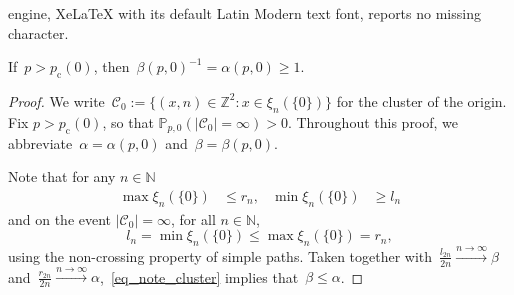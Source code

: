\documentclass[10pt,a4paper]{amsart}
\newcommand{\bbN}{{\ensuremath{\mathbb N}} }
\newcommand{\bbZ}{{\ensuremath{\mathbb Z}} }
\newcommand{\cC}{\ensuremath{\mathcal C}}
\newcommand{\pc}{\ensuremath{p_{\mathrm{c}} }}
\begin{document}
engine, XeLaTeX with its default Latin Modern text font, reports no missing character.
\begin{lemma}
\label{lem:alpha:critical}
	If~$p > \pc(0)$, then~$\beta(p,0)^{-1} = \alpha(p,0) \ge 1$.
\end{lemma}

\begin{proof}
We write~$\cC_0 := \{(x,n){\in\bbZ^2}: x \in \xi_n(\{0\})\}$ {for the cluster of the origin.}
Fix $p > \pc(0)$, so that $\mathbb P_{p,0}(|\mathcal C_0| = \infty) > 0$. Throughout this proof, we abbreviate~$\alpha = \alpha(p,0)$ and~$\beta = \beta(p,0)$.

Note that for any $n\in\bbN$
\begin{align*}
\max \xi_n(\{0\}) &{}\le r_n,&\min \xi_n(\{0\}) &{}\ge l_n
\end{align*}
and on the event $|\cC_0|=\infty$, for all $n\in\bbN$,
\begin{equation}
\label{eq_note_cluster}
l_n = \min \xi_n(\{0\}) \le \max \xi_n(\{0\}) = r_n,
\end{equation}
{using the non-crossing property of simple paths.} Taken together with~$\frac{l_{2n}}{2n} \xrightarrow{n \to \infty} \beta$ and~$\frac{r_{2n}}{2n} \xrightarrow{n \to \infty} \alpha$,~\eqref{eq_note_cluster} implies that~$\beta \le \alpha$.


\end{proof}
\end{document}
